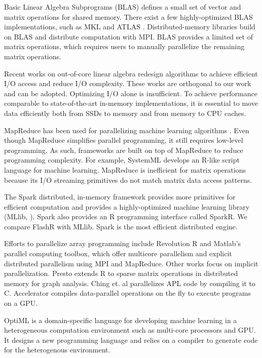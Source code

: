Basic Linear Algebra Subprograms (BLAS) defines a small set of vector and
matrix operations for shared memory. There exist a few highly-optimized BLAS
implementations, such as MKL \cite{mkl} and ATLAS \cite{atlas}. 
Distributed-memory libraries \cite{trilinos, petsc, elemental}
build on BLAS and distribute computation with MPI.
BLAS provides a limited set of matrix operations, which requires
users to manually parallelize the remaining matrix operations.

Recent works on out-of-core linear algebra \cite{Toledo99, Quintana-Orti12}
redesign algorithms to achieve efficient I/O access and reduce I/O
complexity. These works are orthogonal to our work and can be adopted.
Optimizing I/O
alone is insufficient. To achieve performance comparable to state-of-the-art
in-memory implementations, it is essential to move data efficiently both from
SSDs to memory and from memory to CPU caches.

MapReduce \cite{mapreduce} has been used for parallelizing machine learning
algorithms \cite{Chu06}. Even though MapReduce simplifies parallel programming,
it still requires low-level programming.
As such, frameworks are built on top of MapReduce to reduce programming complexity.
For example, SystemML \cite{systemml} develops an R-like script language for
machine learning. MapReduce is inefficient for matrix operations because
its I/O streaming primitives do not match matrix data access patterns.

The Spark \cite{spark} distributed, in-memory framework provides more primitives
for efficient computation and provides a highly-optimized machine learning library
(MLlib, \cite{mllib}).
Spark also provides an R programming interface called SparkR.  
We compare FlashR with MLlib. Spark is the most efficient distributed engine.

Efforts to parallelize array programming include
Revolution R \cite{rro} and Matlab's parallel computing toolbox, which
offer multicore parallelism and explicit distributed parallelism using MPI and MapReduce. 
Other works focus on implicit parallelization.
Presto \cite{presto} extends R to sparse matrix operations in distributed memory for graph
analysis. Ching et. al \cite{Ching12} parallelizes APL code by
compiling it to C. Accelerator \cite{accelerator} compiles
data-parallel operations on the fly to execute programs on a GPU.

OptiML \cite{optiml} is a domain-specific language for developing machine
learning in a heterogeneous computation environment such as multi-core
processors and GPU. It designs a new programming language and relies on
a compiler to generate code for the heterogenous environment.
